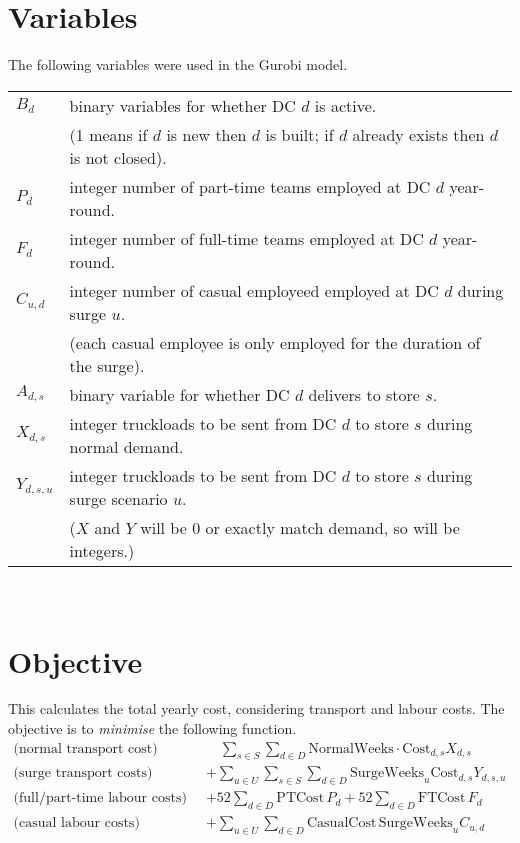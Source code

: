 \documentclass[11pt,a4paper]{article}
\begin{document}
\section{Variables}
The following variables were used in the Gurobi model.\\[0.8em]
\begin{tabular}{l l}
    $B_{d}$ & binary variables for whether DC $d$ is active. \\ 
    & (1 means if $d$ is new then $d$ is built; if $d$ 
    already exists then $d$ is not closed). \\
    $P_d$ & integer number of part-time teams employed at DC $d$ year-round. \\ 
    $F_d$ & integer number of full-time teams employed at DC $d$ year-round. \\ 
    $C_{u,d}$ & integer number of casual employeed employed at DC $d$  during surge $u$. \\
    & (each casual employee is only employed for the duration of the surge). \\ 
    $A_{d,s}$ & binary variable for whether DC $d$ delivers to store $s$. \\  
    $X_{d,s}$ & integer truckloads to be sent from DC $d$ to store $s$ during normal demand. \\
    $Y_{d,s,u}$ & integer truckloads to be sent from DC $d$ to store $s$ during 
    surge scenario $u$.  \\ 
    & ($X$ and $Y$ will be 0 or exactly match demand, so will be integers.)
\end{tabular}
\\[0.8em]

\section{Objective}
This calculates the total yearly cost, considering transport and labour costs.
The objective is to \textit{minimise} the following function.
\begin{align*}
    \text{(normal transport cost)} \qquad&\quad \sum_{s \in S} \sum_{d \in D} \mathrm{NormalWeeks} \cdot \mathrm{Cost}_{d, s}  X_{d,s} \\ 
    \text{(surge transport costs)} \qquad &+ \sum_{u \in U} \sum_{s \in S} \sum_{d \in D} \mathrm{SurgeWeeks}_u \mathrm{Cost}_{d, s} Y_{d,s,u} \\ 
    \text{(full/part-time labour costs)} \qquad &+ 52 \sum_{d \in D} \mathrm{PTCost}\, P_d + 52 \sum_{d \in D}\mathrm{FTCost} \,F_d \\
    \text{(casual labour costs)} \qquad &+\sum_{u \in U} \sum_{d \in D} \mathrm{CasualCost}\,\mathrm{SurgeWeeks}_u C_{u,d}
\end{align*}
\end{document}
